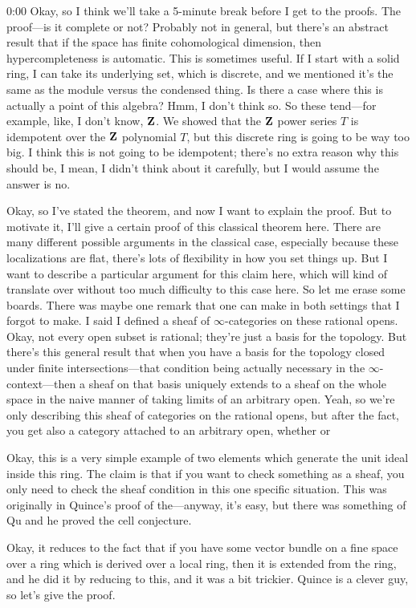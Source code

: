\begin{unfinished}{0:00}
Okay, so I think we'll take a 5-minute break before I get to the proofs. The proof---is it complete or not? Probably not in general, but there's an abstract result that if the space has finite cohomological dimension, then hypercompleteness is automatic. This is sometimes useful. If I start with a solid ring, I can take its underlying set, which is discrete, and we mentioned it's the same as the module versus the condensed thing. Is there a case where this is actually a point of this algebra? Hmm, I don't think so. So these tend---for example, like, I don't know, $\mathbf Z$. We showed that the $\mathbf Z$ power series $T$ is idempotent over the $\mathbf Z$ polynomial $T$, but this discrete ring is going to be way too big. I think this is not going to be idempotent; there's no extra reason why this should be, I mean, I didn't think about it carefully, but I would assume the answer is no.

Okay, so I've stated the theorem, and now I want to explain the proof. But to motivate it, I'll give a certain proof of this classical theorem here. There are many different possible arguments in the classical case, especially because these localizations are flat, there's lots of flexibility in how you set things up. But I want to describe a particular argument for this claim here, which will kind of translate over without too much difficulty to this case here. So let me erase some boards. There was maybe one remark that one can make in both settings that I forgot to make. I said I defined a sheaf of $\infty$-categories on these rational opens. Okay, not every open subset is rational; they're just a basis for the topology. But there's this general result that when you have a basis for the topology closed under finite intersections---that condition being actually necessary in the $\infty$-context---then a sheaf on that basis uniquely extends to a sheaf on the whole space in the naive manner of taking limits of an arbitrary open. Yeah, so we're only describing this sheaf of categories on the rational opens, but after the fact, you get also a category attached to an arbitrary open, whether or

Okay, this is a very simple example of two elements which generate the unit ideal inside this ring. The claim is that if you want to check something as a sheaf, you only need to check the sheaf condition in this one specific situation. This was originally in Quince's proof of the---anyway, it's easy, but there was something of Qu and he proved the cell conjecture.

Okay, it reduces to the fact that if you have some vector bundle on a fine space over a ring which is derived over a local ring, then it is extended from the ring, and he did it by reducing to this, and it was a bit trickier. Quince is a clever guy, so let's give the proof.


\end{unfinished}
